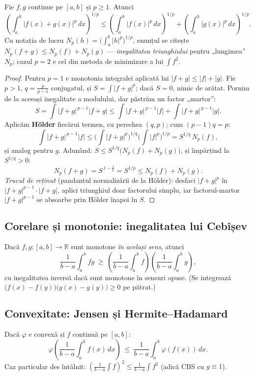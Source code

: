 \begin{teorema}
Fie $f,g$ continue pe $[a,b]$ și $p\ge1$. Atunci
\[
\left(\int_a^b|f(x)+g(x)|^{p}\,dx\right)^{1/p}\le
\left(\int_a^b|f(x)|^{p}\,dx\right)^{1/p}+
\left(\int_a^b|g(x)|^{p}\,dx\right)^{1/p}.
\]
Cu notația de lucru $N_p(h)=\big(\int_a^b|h|^p\big)^{1/p}$, enunțul se citește $N_p(f+g)\le N_p(f)+N_p(g)$ --- \emph{inegalitatea triunghiului} pentru „lungimea'' $N_p$; cazul $p=2$ e cel din metoda de minimizare a lui $\int f^2$.
\end{teorema}
\begin{proof}
Pentru $p=1$ e monotonia integralei aplicată lui $|f+g|\le|f|+|g|$. Fie $p>1$, $q=\frac{p}{p-1}$ conjugatul, și $S=\int|f+g|^p$; dacă $S=0$, nimic de arătat. Pornim de la aceeași inegalitate a modulului, dar păstrăm un factor „martor'':
\[
S=\int|f+g|^{\,p-1}|f+g|\le\int|f+g|^{\,p-1}|f|+\int|f+g|^{\,p-1}|g|.
\]
Aplicăm \textbf{Hölder} fiecărui termen, cu perechea $(q,p)$; cum $(p-1)q=p$:
\[
\int|f+g|^{\,p-1}|f|\le\Big(\int|f+g|^{p}\Big)^{1/q}\Big(\int|f|^{p}\Big)^{1/p}=S^{1/q}\,N_p(f),
\]
și analog pentru $g$. Adunând: $S\le S^{1/q}\big(N_p(f)+N_p(g)\big)$, și împărțind la $S^{1/q}>0$:
\[
N_p(f+g)=S^{\,1-\frac1q}=S^{1/p}\le N_p(f)+N_p(g).
\]
\emph{Trucul de reținut} (pandantul normalizării de la Hölder): desfaci $|f+g|^p$ în $|f+g|^{p-1}\cdot|f+g|$, aplici triunghiul doar factorului simplu, iar factorul-martor $|f+g|^{p-1}$ se absoarbe prin Hölder înapoi în $S$.
\end{proof}

\subsection{Corelare și monotonie: inegalitatea lui Cebîșev}

\begin{teorema}
Dacă $f,g:[a,b]\to\mathbb{R}$ sunt monotone \emph{în același sens}, atunci
\[
\frac{1}{b-a}\int_a^b fg\ \ge\ \left(\frac{1}{b-a}\int_a^b f\right)\left(\frac{1}{b-a}\int_a^b g\right),
\]
cu inegalitatea inversă dacă sunt monotone în sensuri opuse. (Se integrează $\big(f(x)-f(y)\big)\big(g(x)-g(y)\big)\ge0$ pe pătrat.)
\end{teorema}

\subsection{Convexitate: Jensen și Hermite--Hadamard}

\begin{teorema}
Dacă $\varphi$ e convexă și $f$ continuă pe $[a,b]$:
\[
\varphi\!\left(\frac{1}{b-a}\int_a^b f(x)\,dx\right)\ \le\ \frac{1}{b-a}\int_a^b \varphi(f(x))\,dx.
\]
Caz particular des întâlnit: $\left(\frac1{b-a}\int f\right)^2\le\frac1{b-a}\int f^2$ (adică CBS cu $g\equiv1$).
\end{teorema}

